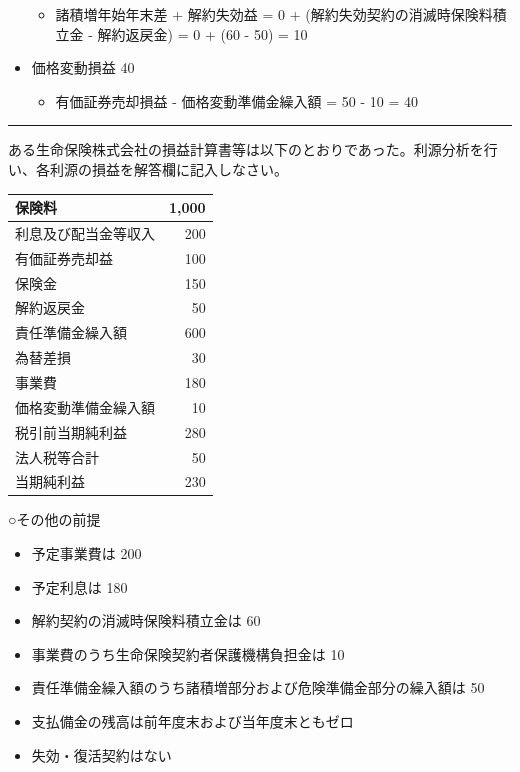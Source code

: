 \documentclass[report,gutter=10mm,fore-edge=10mm,uplatex,dvipdfmx]{jlreq}
\begin{document}
\begin{itemize}
  \begin{itemize}
  \tightlist
  \item
    諸積増年始年末差 + 解約失効益 = 0 +
    (解約失効契約の消滅時保険料積立金 - 解約返戻金) = 0 + (60 - 50) = 10
  \end{itemize}
\item
  価格変動損益 40

  \begin{itemize}
  \tightlist
  \item
    有価証券売却損益 - 価格変動準備金繰入額 = 50 - 10 = 40
  \end{itemize}
\end{itemize}

\begin{center}\rule{0.5\linewidth}{0.5pt}\end{center}


ある生命保険株式会社の損益計算書等は以下のとおりであった。利源分析を行い、各利源の損益を解答欄に記入しなさい。

\begin{tabular}{|l|r|}
\hline
 保険料&1,000\\ \hline 
 利息及び配当金等収入&200\\ \hline  
 有価証券売却益&100 \\ \hline 
保険金&150\\ \hline 
 解約返戻金&50 \\ \hline 
責任準備金繰入額&600\\ \hline 
 為替差損&30\\ \hline 
 事業費&180\\ \hline 
 価格変動準備金繰入額&10\\ \hline  
税引前当期純利益&280\\ \hline  
法人税等合計&50\\ \hline  
当期純利益&230\\ \hline 
\end{tabular}

○その他の前提 
\begin{itemize}
\item 予定事業費は 200 
\item 予定利息は 180
\item 解約契約の消滅時保険料積立金は 60
\item 事業費のうち生命保険契約者保護機構負担金は 10
\item 責任準備金繰入額のうち諸積増部分および危険準備金部分の繰入額は 50
\item 支払備金の残高は前年度末および当年度末ともゼロ 
\item 失効・復活契約はない
\end{itemize}
\end{document}
